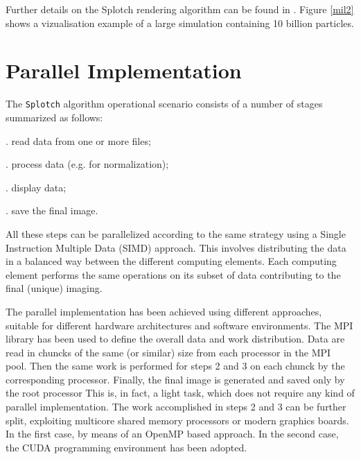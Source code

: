 %

Further details on the Splotch rendering algorithm can be found in \citep{2008NJPh...10l5006D}. 
Figure \ref{mil2} shows a vizualisation example of a large simulation 
containing 10 billion particles.

\section{Parallel Implementation}
\label{parallel}

The {\tt Splotch} algorithm operational scenario consists of a number of 
stages summarized as follows:

. read data from one or more files;

. process data (e.g. for normalization);

. display data;

. save the final image.

All these steps can be parallelized according to the same strategy using a 
Single Instruction Multiple Data (SIMD) approach. This involves distributing the data 
in a balanced way between the different computing elements. Each computing element 
performs the same operations on its subset of data contributing to the final (unique) imaging. 

The parallel implementation has been achieved using different approaches, 
suitable for different hardware architectures and software environments. 
The MPI library \cite{mpi} has been used to define the overall data and work 
distribution. Data are read in chuncks of the same (or similar) size from each processor 
in the MPI pool. Then the same work is performed for steps 2 and 3 on each chunck by the 
corresponding processor. Finally, the final image is generated and saved only by the root processor
This is, in fact, a light task, which does not require any kind of parallel implementation. 
The work accomplished in steps 2 and 3 can be further split, exploiting 
multicore shared memory processors or modern graphics boards. In the first case, by means of
an OpenMP \cite{openmp} based approach. In the second case, the CUDA \cite{cuda} programming 
environment has been adopted. 

